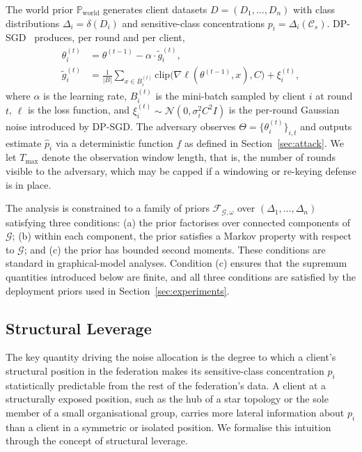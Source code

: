\documentclass[letterpaper,journal]{IEEEtran}
\begin{document}
The world prior $\mathbb{P}_{\mathrm{world}}$ generates client datasets
$D = (D_1,\ldots,D_n)$ with class distributions
$\Delta_i = \delta(D_i)$ and sensitive-class concentrations
$p_i = \Delta_i(\mathcal{C}_s)$. DP-SGD~\cite{abadi2016dpsgd}
produces, per round and per client,
\begin{equation}
\begin{split}
\theta_i^{(t)} &= \theta^{(t-1)} - \alpha \cdot \tilde{g}_i^{(t)},\\
\tilde{g}_i^{(t)} &= \frac{1}{|B|}\sum_{x \in B_i^{(t)}}
\mathrm{clip}\bigl(\nabla\ell(\theta^{(t-1)},x), C\bigr)
+ \xi_i^{(t)},
\end{split}
\label{eq:dpsgd}
\end{equation}
where $\alpha$ is the learning rate, $B_i^{(t)}$ is the mini-batch
sampled by client $i$ at round $t$, $\ell$ is the loss function, and
$\xi_i^{(t)} \sim \mathcal{N}(0, \sigma_i^2 C^2 I)$ is the per-round
Gaussian noise introduced by DP-SGD. The adversary observes
$\Theta = \{\theta_i^{(t)}\}_{i,t}$ and outputs estimate $\hat{p}_i$
via a deterministic function $f$ as defined in
Section~\ref{sec:attack}. We let $T_{\max}$ denote the observation
window length, that is, the number of rounds visible to the
adversary, which may be capped if a windowing or re-keying defense
is in place.

The analysis is constrained to a family of priors
$\mathcal{F}_{\mathcal{G},\omega}$ over $(\Delta_1,\ldots,\Delta_n)$
satisfying three conditions: (a) the prior factorises over connected
components of $\mathcal{G}$; (b) within each component, the prior
satisfies a Markov property with respect to $\mathcal{G}$; and
(c) the prior has bounded second moments. These conditions are
standard in graphical-model analyses. Condition (c) ensures that the
supremum quantities introduced below are finite, and all three
conditions are satisfied by the deployment priors used in
Section~\ref{sec:experiments}.

\subsection{Structural Leverage}
\label{sec:defense-leverage}

The key quantity driving the noise allocation is the degree to which
a client's structural position in the federation makes its
sensitive-class concentration $p_i$ statistically predictable from
the rest of the federation's data. A client at a structurally exposed
position, such as the hub of a star topology or the sole member of a
small organisational group, carries more lateral information about
$p_i$ than a client in a symmetric or isolated position. We formalise
this intuition through the concept of structural leverage.
\end{document}
